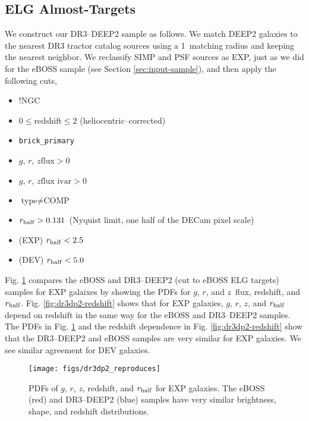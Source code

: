 \documentclass[a4paper,fleqn,usenatbib]{mnras}
\newcommand{\rhalf}{r_{\rm{half}}}
\newcommand{\gb}{$g$}
\newcommand{\rband}{$r$}
\newcommand{\zb}{$z$}
\begin{document}
\subsection{ELG Almost-Targets}
\label{a:eboss-almost-targets}

We construct our DR3--DEEP2 sample as follows. We match DEEP2 galaxies to the nearest DR3 tractor catalog sources using a 1\arcsec\, matching radius and keeping the nearest neighbor. We reclassify SIMP and PSF sources as EXP, just as we did for the eBOSS sample (see Section \ref{sec:input-sample}), and then apply the following cuts, 
\begin{itemize}
\item !NGC
\item $0 \le \text{redshift} \le 2$ (heliocentric--corrected)
\item \verb|brick_primary|
\item \gb, \rband, \zb $\text{flux} > 0$
\item \gb, \rband, \zb $\text{flux ivar} > 0$
\item $\text{type} \neq \text{COMP}$
\item $\rhalf  > 0.131$\arcsec\, (Nyquist limit, one half of the DECam pixel scale)
\item (EXP) $\rhalf  < 2.5$\arcsec
\item (DEV) $\rhalf  < 5.0$\arcsec
\end{itemize}

Fig. \ref{fig:dr3dp2-reproduces} compares the eBOSS and DR3--DEEP2 (cut to eBOSS ELG targets) samples for EXP galaixes by showing the PDFs for \gb, \rband, and \zb\, flux, redshift, and $\rhalf$. Fig. \ref{fig:dr3dp2-redshift} shows that for EXP galaxies, \gb, \rband, \zb, and $\rhalf$ depend on redshift in the same way for the eBOSS and DR3--DEEP2 samples. The PDFs in Fig. \ref{fig:dr3dp2-reproduces} and the redshift dependence in Fig. \ref{fig:dr3dp2-redshift} show that the DR3--DEEP2 and eBOSS samples are very similar for EXP galaxies. We see similar agreement for DEV galaxies. 

\begin{figure}
\begin{center}
 \texttt{[image: figs/dr3dp2\_reproduces]}
\end{center}
 \caption[The eBOSS and DR3--DEEP2 samples]{PDFs of \gb, \rband, \zb, redshift, and $\rhalf$ for EXP galaxies. The eBOSS (red) and DR3--DEEP2 (blue) samples have very similar brightness, shape, and redshift distributions.}
 \label{fig:dr3dp2-reproduces}
\end{figure}
\end{document}

